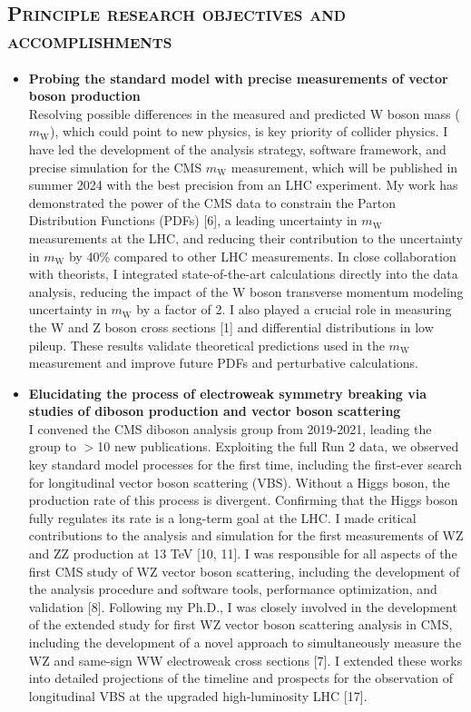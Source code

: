 \documentclass[10pt]{res} %
\newcommand{\mw}{\ensuremath{m_{\mathrm{W}}}}
\begin{document}
\begin{resume}
\section{\textsc{Principle research objectives and accomplishments}}
\begin{itemize}
  \item\textbf{{Probing the standard model with precise measurements of vector boson production}} \\
    Resolving possible differences in the measured and predicted W boson mass (\mw), which could point to new physics, 
    is key priority of collider physics.
    I have led the development of the analysis strategy, software framework, and precise simulation for the CMS $\mw$ measurement, 
    which will be published in summer 2024 with the best precision from an LHC experiment. My work has demonstrated the 
    power of the CMS data to constrain the Parton Distribution Functions (PDFs) [6], a leading uncertainty in $\mw$ measurements at the LHC,
    and reducing their contribution to the uncertainty in $\mw$ by 40\% compared to other LHC measurements. 
    In close collaboration with theorists, I integrated state-of-the-art calculations directly into the data analysis,
    reducing the impact of the W boson transverse momentum modeling uncertainty in $\mw$ by a factor of 2.
    I also played a crucial role in measuring the W and Z boson cross sections [1] and differential distributions in low pileup. 
    These results validate theoretical predictions used in the $\mw$ measurement and improve future PDFs and perturbative calculations.

  \item\textbf{Elucidating the process of electroweak symmetry breaking via studies of diboson production and vector boson scattering} \\
    I convened the CMS diboson analysis group from 2019-2021, leading the group to $>$10 new publications. 
    Exploiting the full Run 2 data, we observed key standard model processes for the first time, including the first-ever search 
    for longitudinal vector boson scattering (VBS). Without a Higgs boson, 
    the production rate of this process is divergent. Confirming that the Higgs boson fully regulates its rate is a long-term goal at the LHC.
    I made critical contributions to the analysis and simulation for the first measurements of WZ and ZZ production at 13 TeV [10, 11]. 
    I was responsible for all aspects of the first CMS study of WZ vector boson scattering, including the development of the analysis 
    procedure and software tools, performance optimization, and validation [8]. Following my Ph.D., I was closely involved in the 
    development of the extended study for first WZ vector boson scattering analysis in CMS, including the development of a novel 
    approach to simultaneously measure the WZ and same-sign WW electroweak cross sections [7]. I extended these works into detailed 
    projections of the timeline and prospects for the observation of longitudinal VBS at the upgraded high-luminosity LHC [17].


\end{itemize}
\end{resume}
\end{document}
